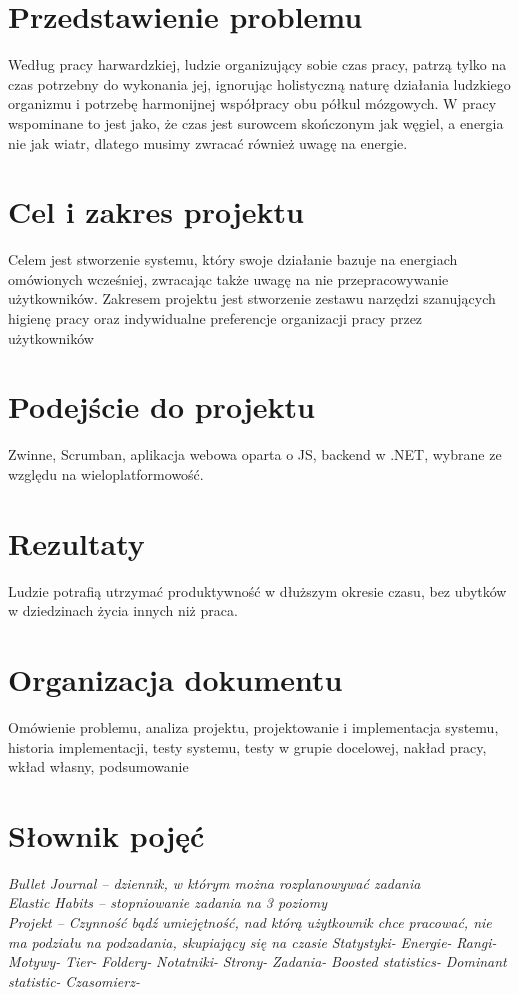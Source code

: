 \documentclass[a4paper,11pt]{report}
\begin{document}
\section{Przedstawienie problemu}
Według pracy harwardzkiej, ludzie organizujący sobie czas pracy, patrzą tylko na czas potrzebny do wykonania jej, ignorując holistyczną naturę działania ludzkiego organizmu i potrzebę harmonijnej współpracy obu półkul mózgowych. W pracy wspominane to jest jako, że czas jest surowcem skończonym jak węgiel, a energia nie jak wiatr, dlatego musimy zwracać również uwagę na energie.

\section{Cel i zakres projektu}
Celem jest stworzenie systemu, który swoje działanie bazuje na energiach omówionych wcześniej, zwracając także uwagę na nie przepracowywanie użytkowników.
\vspace{0,5cm}
Zakresem projektu jest stworzenie zestawu narzędzi szanujących higienę pracy oraz indywidualne preferencje organizacji pracy przez użytkowników

\section{Podejście do projektu}
Zwinne, Scrumban, aplikacja webowa oparta o JS, backend w .NET, wybrane ze względu na wieloplatformowość.

\section{Rezultaty}
Ludzie potrafią utrzymać produktywność w dłuższym okresie czasu, bez ubytków w dziedzinach życia innych niż praca.

\section{Organizacja dokumentu}
Omówienie problemu, analiza projektu, projektowanie i implementacja systemu, historia implementacji, testy systemu, testy w grupie docelowej, nakład pracy, wkład własny, podsumowanie

\section {Słownik pojęć}
	\emph{Bullet Journal – dziennik, w którym można rozplanowywać zadania}\\
	\emph{Elastic Habits – stopniowanie zadania na 3 poziomy}\\
	\emph{Projekt – Czynność bądź umiejętność, nad którą użytkownik chce pracować, nie ma podziału na podzadania, skupiający się na czasie}
	\emph{Statystyki-}
	\emph{Energie-}
	\emph{Rangi-}
	\emph{Motywy-}
	\emph{Tier-}
	\emph{Foldery-}
	\emph{Notatniki-}
	\emph{Strony-}
	\emph{Zadania-}
	\emph{Boosted statistics-}
	\emph{Dominant statistic-}
	\emph{Czasomierz-}
	
\end{document}
